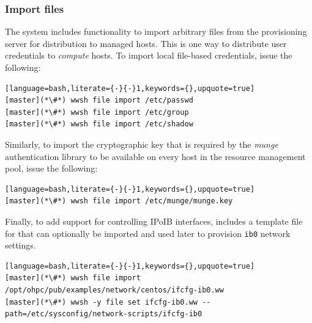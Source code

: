 \documentclass[letterpaper]{article}
\begin{document}


\subsubsection{Import files} \label{sec:file_import}

The \Warewulf{} system includes functionality to import arbitrary files from the
provisioning server for distribution to managed hosts. This is one way
to distribute user credentials to {\em compute} hosts. To
import local file-based credentials, issue the following:

\begin{lstlisting}[language=bash,literate={-}{-}1,keywords={},upquote=true]
[master](*\#*) wwsh file import /etc/passwd                                                                                                       
[master](*\#*) wwsh file import /etc/group
[master](*\#*) wwsh file import /etc/shadow 
\end{lstlisting}

Similarly, to import the cryptographic key that is required by the {\em munge}
authentication library to be available on every host in the resource management
pool, issue the following:

\begin{lstlisting}[language=bash,literate={-}{-}1,keywords={},upquote=true]
[master](*\#*) wwsh file import /etc/munge/munge.key
\end{lstlisting}

Finally, to add support for controlling IPoIB interfaces, \OHPC{} includes a
template file for \Warewulf{} that can optionally be imported and used later to provision
\texttt{ib0} network settings.

\begin{lstlisting}[language=bash,literate={-}{-}1,keywords={},upquote=true]
[master](*\#*) wwsh file import /opt/ohpc/pub/examples/network/centos/ifcfg-ib0.ww
[master](*\#*) wwsh -y file set ifcfg-ib0.ww --path=/etc/sysconfig/network-scripts/ifcfg-ib0
\end{lstlisting}



\end{document}
